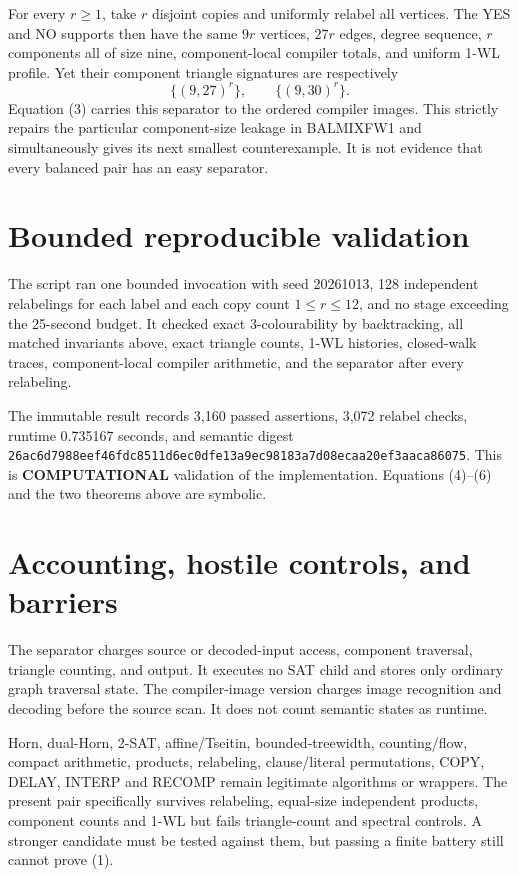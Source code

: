 \documentclass[11pt]{article}
\newcommand{\COMP}{\textbf{COMPUTATIONAL}}
\begin{document}
For every $r\ge1$, take $r$ disjoint copies and uniformly relabel all
vertices.  The YES and NO supports then have the same $9r$ vertices, $27r$
edges, degree sequence, $r$ components all of size nine, component-local
compiler totals, and uniform 1-WL profile.  Yet their component triangle
signatures are respectively
\[
                \{(9,27)^r\},\qquad\{(9,30)^r\}.            \tag{6}
\]
Equation (3) carries this separator to the ordered compiler images.  This
strictly repairs the particular component-size leakage in BALMIXFW1 and
simultaneously gives its next smallest counterexample.  It is not evidence
that every balanced pair has an easy separator.

\section{Bounded reproducible validation}
The script
ran one bounded invocation with seed 20261013, 128 independent relabelings
for each label and each copy count $1\le r\le12$, and no stage exceeding the
25-second budget.  It checked exact 3-colourability by backtracking, all
matched invariants above, exact triangle counts, 1-WL histories, closed-walk
traces, component-local compiler arithmetic, and the separator after every
relabeling.

The immutable result
records 3,160 passed assertions, 3,072 relabel checks, runtime 0.735167
seconds, and semantic digest
\texttt{26ac6d7988eef46fdc8511d6ec0dfe13a9ec98183a7d08ecaa20ef3aaca86075}.
This is \COMP{} validation of the implementation.  Equations (4)--(6) and
the two theorems above are symbolic.

\section{Accounting, hostile controls, and barriers}
The separator charges source or decoded-input access, component traversal,
triangle counting, and output.  It executes no SAT child and stores only
ordinary graph traversal state.  The compiler-image version charges image
recognition and decoding before the source scan.  It does not count semantic
states as runtime.

Horn, dual-Horn, 2-SAT, affine/Tseitin, bounded-treewidth, counting/flow,
compact arithmetic, products, relabeling, clause/literal permutations,
COPY, DELAY, INTERP and RECOMP remain legitimate algorithms or wrappers.
The present pair specifically survives relabeling, equal-size independent
products, component counts and 1-WL but fails triangle-count and spectral
controls.  A stronger candidate must be tested against them, but passing a
finite battery still cannot prove (1).
\end{document}
